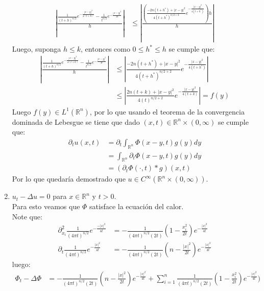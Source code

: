 \begin{homeworkProblem}
\begin{solucion}
\begin{enumerate}
\begin{align*}
          \left| \frac{\frac{1}{(t+h)^{n/2}}e^{-\frac{|x-y|^2}{4(t+h)}}-\frac{1}{t^{n/2}}e^{-\frac{|x-y|^2}{4t}}}{h} \right|&\leq \left| \frac{\left( \frac{-2n(t+h^*)+|x-y|^2}{4(t+h^*)^{n/2+2}}e^{-\frac{|x-y|^2}{4(t+h^*)}} \right)h}{h} \right|
        \end{align*}
        Luego, suponga $h\leq k$, entonces como $0\leq h^*\leq h$ se cumple que:
        \begin{align*}
          \left| \frac{\frac{1}{(t+h)^{n/2}}e^{-\frac{|x-y|^2}{4(t+h)}}-\frac{1}{t^{n/2}}e^{-\frac{|x-y|^2}{4t}}}{h} \right|&\leq \left| \frac{-2n(t+h^*)+|x-y|^2}{4(t+h^*)^{n/2+2}}e^{-\frac{|x-y|^2}{4(t+h^*)}} \right|\\
          &\leq \left| \frac{2n(t+k)+|x-y|^2}{4(t)^{n/2+2}}e^{-\frac{|x-y|^2}{4(t+k)}} \right|=f(y)
        \end{align*}
        Luego $f(y)\in L^1(\mathbb{R}^{n})$, por lo que usando el teorema de la convergencia dominada de Lebesgue se tiene que dado $(x,t)\in\mathbb{R}^{n}\times (0,\infty)$ se cumple que:
        \begin{align*}
          \partial_{t}u(x,t)&=\partial_{t}\int_{\mathbb{R}^{n}}\Phi(x-y,t)g(y)dy\\
          &=\int_{\mathbb{R}^{n}}\partial_{t}\Phi(x-y,t)g(y)dy\\
          &=(\partial_{t}\Phi(\cdot,t)*g)(x,t)
        \end{align*}
        Por lo que quedaría demostrado que $u\in C^{\infty}(\mathbb{R}^{n}\times (0,\infty))$.
        \demostrado
        \newpage
      \item $u_t-\Delta u=0$ para $x\in\mathbb{R}^{n}$ y $t>0$.\\
        Para esto veamos que $\Phi$ satisface la ecuación del calor.\\
        Note que:
        \begin{align*}
          \partial_{x_i}^2\frac{1}{(4\pi t)^{n/2}}e^{-\frac{-|x|^2}{4t}}&=-\frac{1}{(4\pi t)^{n/2}(2t)}\left( 1-\frac{x_i^2}{2t} \right)e^{-\frac{|x|^2}{4t}}\\
          \partial_{t}\frac{1}{(4\pi t)^{n/2}}e^{-\frac{|x|^2}{4t}}&=-\frac{1}{(4\pi t)^{n/2}(2t)}\left( n-\frac{|x|^2}{2t} \right)e^{-\frac{|x|^2}{4t}}
        \end{align*}
        luego:
        \begin{align*}
          \Phi_t-\Delta\Phi&=-\frac{1}{(4\pi t)^{n/2}(2t)}\left( n-\frac{|x|^2}{2t} \right)e^{-\frac{|x|^2}{4t}}+\sum_{i=1}^{n}\frac{1}{(4\pi t)^{n/2}(2t)}\left( 1-\frac{x_i^2}{2t} \right)e^{-\frac{|x|^2}{4t}})\\

\end{align*}
\end{enumerate}
\end{solucion}
\end{homeworkProblem}

